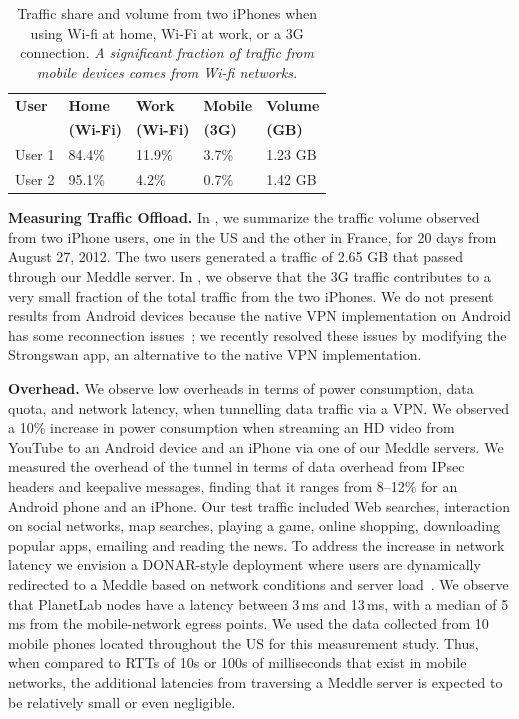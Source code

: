 \documentclass{sig-alternate-10pt}
\newcommand{\meddle}{{Meddle}\xspace}
\renewcommand{\fref}{\Fref}
\begin{document}
\begin{table}
\centering
\begin{small}
\begin{tabular}{|l|l|l|l|l|}
\hline
{\bf User} & {\bf Home} & {\bf Work} & {\bf Mobile} & {\bf Volume}\\
    & {\bf (Wi-Fi)} & {\bf (Wi-Fi)} & {\bf (3G)} & {\bf (GB)}\\
\hline
User 1 & 84.4\% & 11.9\% & 3.7\%  & 1.23 GB\\
\hline
User 2 & 95.1\% & 4.2\% & 0.7\%  & 1.42 GB\\
\hline
\end{tabular}
\end{small}
\caption{Traffic share and volume from two iPhones when using Wi-fi at
  home, Wi-Fi at work, or a 3G connection. \emph{A significant
    fraction of traffic from mobile devices comes from Wi-fi networks.}}
\label{tab:Usage}
\vspace{-0.1in}
\end{table}

\textbf{Measuring Traffic Offload.} In \fref{tab:Usage}, we summarize
the traffic volume observed from two iPhone users, one in the US and
the other in France, for 20 days from August 27, 2012. The two users
generated a traffic of 2.65 GB that passed through our \meddle
server. In \fref{tab:Usage}, we observe that the 3G traffic contributes
to a very small fraction of the total traffic from the
two iPhones. We do not present results from Android devices because
the native VPN implementation on Android has some reconnection issues~\cite{OnDemandAndroid};
we recently resolved these issues by  modifying the Strongswan
app, an alternative to the native VPN implementation.

\textbf{Overhead.} We observe low overheads in terms of power
consumption, data quota, and network latency, when tunnelling data
traffic via a VPN. We observed a 10\%  increase in power consumption
when streaming an HD video from YouTube to an Android device and an
iPhone via one of our \meddle servers. We measured the overhead of the
tunnel in terms of data overhead from IPsec headers and keepalive
messages, finding that it ranges from 8--12\% for an Android phone and
an iPhone. Our test traffic included Web searches, interaction on
social networks, map searches, playing a game, online shopping,
downloading popular apps, emailing and reading the news. To address
the increase in network latency we envision a DONAR-style deployment
where users are dynamically redirected to a \meddle based on network
conditions and server load~\cite{wendell:donar}. We observe that
PlanetLab nodes have a latency between 3\,ms and 13\,ms, with a median
of 5\,ms from the mobile-network egress points. We used the data
collected from 10 mobile phones located throughout the US for this
measurement study. Thus, when compared to RTTs of 10s or 100s of
milliseconds that exist in mobile networks, the additional latencies
from traversing a \meddle server is expected to be relatively small or
even negligible.  
\end{document}
